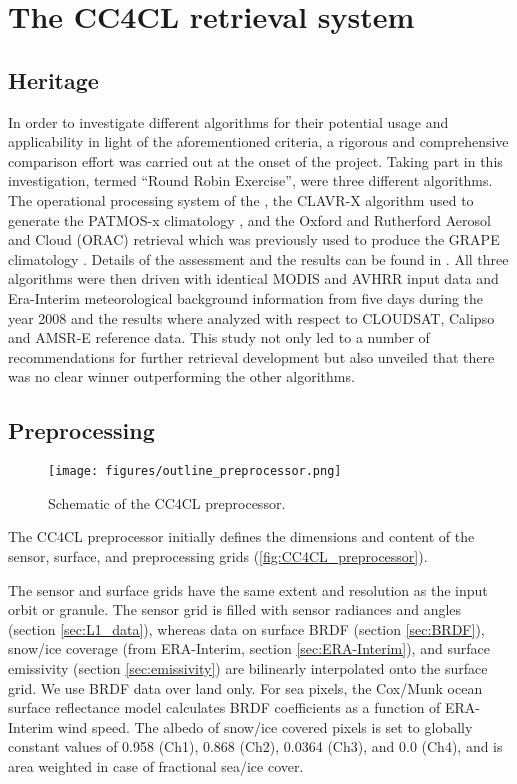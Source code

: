 \section{The CC4CL retrieval system}\label{processing_chain}

\subsection{Heritage}

In order to investigate different algorithms for their potential usage and
applicability in light of the aforementioned criteria, a rigorous and
comprehensive comparison effort was carried out at the onset of the
project.
Taking part in this investigation, termed ``Round Robin Exercise'',
were three different algorithms. The operational processing system of the
\citet{CMSAF_web}, the CLAVR-X algorithm used to generate the PATMOS-x
climatology \citep{Heidinger13}, and the Oxford and Rutherford Aerosol and
Cloud (ORAC) retrieval \citep{Thomas09, Poulsen12} which was previously used
to produce the GRAPE climatology \citep{Thomas09_GRAPE, GRAPE_web}.
Details of the assessment and the results can be found in
\citet{Stengel15}. All three algorithms were then driven with identical MODIS
and AVHRR input data and Era-Interim meteorological background information
from five days during the year 2008 and the results where analyzed with
respect to CLOUDSAT, Calipso and AMSR-E reference data.
This study not only led to a number of recommendations for further retrieval
development but also unveiled that there was no clear winner outperforming the
other algorithms.

\subsection{Preprocessing}

\begin{figure}[h]
  \texttt{[image: figures/outline\_preprocessor.png]}
  \caption{Schematic of the CC4CL preprocessor.}
  \label{fig:CC4CL_preprocessor}
\end{figure}

The CC4CL preprocessor initially defines the dimensions and content of the sensor, surface, and preprocessing grids (\autoref{fig:CC4CL_preprocessor}).

The sensor and surface grids have the same extent and resolution as the input orbit or granule. The sensor grid is filled with sensor radiances and angles (section \ref{sec:L1_data}), whereas data on surface BRDF (section \ref{sec:BRDF}), snow/ice coverage (from ERA-Interim, section \ref{sec:ERA-Interim}), and surface emissivity (section \ref{sec:emissivity}) are bilinearly interpolated onto the surface grid. We use BRDF data over land only. For sea pixels, the Cox/Munk ocean surface reflectance model calculates BRDF coefficients as a function of ERA-Interim wind speed. The albedo of snow/ice covered pixels is set to globally constant values of 0.958 (Ch1), 0.868 (Ch2), 0.0364 (Ch3), and 0.0 (Ch4), and is area weighted in case of fractional sea/ice cover.

